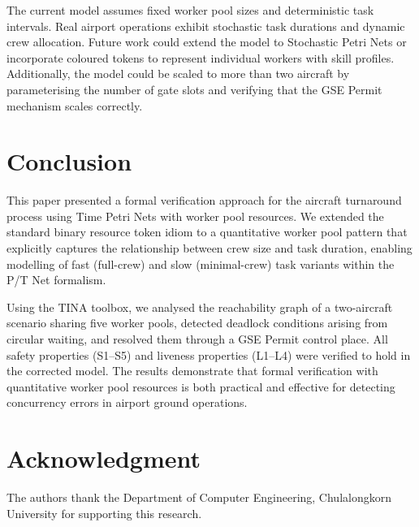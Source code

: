 \documentclass[conference,a4paper]{IEEEtran}
\begin{document}
The current model assumes fixed worker pool sizes and deterministic task
intervals. Real airport operations exhibit stochastic task durations and
dynamic crew allocation. Future work could extend the model to Stochastic
Petri Nets or incorporate coloured tokens to represent individual workers with
skill profiles. Additionally, the model could be scaled to more than two
aircraft by parameterising the number of gate slots and verifying that the
GSE Permit mechanism scales correctly.

\section{Conclusion}

This paper presented a formal verification approach for the aircraft
turnaround process using Time Petri Nets with worker pool resources. We
extended the standard binary resource token idiom to a quantitative worker
pool pattern that explicitly captures the relationship between crew size and
task duration, enabling modelling of fast (full-crew) and slow (minimal-crew)
task variants within the P/T Net formalism.

Using the TINA toolbox, we analysed the reachability graph of a two-aircraft
scenario sharing five worker pools, detected deadlock conditions arising from
circular waiting, and resolved them through a GSE Permit control place. All
safety properties (S1--S5) and liveness properties (L1--L4) were verified to
hold in the corrected model. The results demonstrate that formal verification
with quantitative worker pool resources is both practical and effective for
detecting concurrency errors in airport ground operations.

\section*{Acknowledgment}

The authors thank the Department of Computer Engineering, Chulalongkorn
University for supporting this research.
\end{document}
